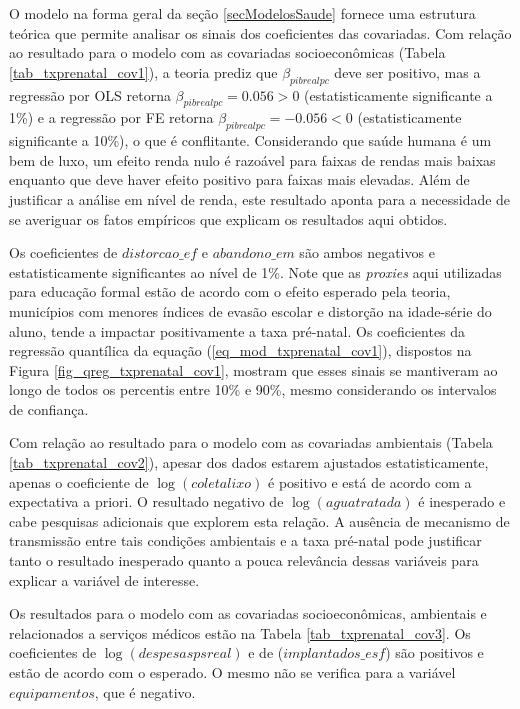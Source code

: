 \documentclass[twoside,onecolumn,12pt]{article}
\numberwithin{outputctr}{section}
\begin{document}
O modelo na forma geral da seção \ref{secModelosSaude} fornece uma estrutura te\'{o}rica que permite analisar os sinais dos coeficientes das covariadas.
Com rela\c{c}\~{a}o ao resultado para o modelo com as covariadas socioeconômicas (Tabela \ref{tab_txprenatal_cov1}),
a teoria prediz que $\beta_{pibrealpc}$ deve ser positivo, mas
a regress\~{a}o por OLS retorna $\beta_{pibrealpc} = 0.056 > 0$ (estatisticamente significante a 1\%)
e a regress\~{a}o por FE retorna $\beta_{pibrealpc} = -0.056 < 0$ (estatisticamente significante a 10\%),
o que \'{e} conflitante. Considerando que saúde humana é um bem de luxo, um efeito renda nulo é razoável para faixas de rendas mais baixas enquanto que deve haver efeito positivo para faixas mais elevadas. Além de justificar a análise em nível de renda, este resultado aponta para a necessidade de se averiguar os fatos empíricos que explicam os resultados aqui obtidos.

Os coeficientes de $distorcao\_ef$ e $abandono\_em$ s\~{a}o ambos negativos e estatisticamente significantes ao n\'{i}vel de 1\%. Note que as \textit{proxies} aqui utilizadas para educação formal estão de acordo com o efeito esperado pela teoria, municípios com menores índices de evasão escolar e distorção na idade-série do aluno, tende a impactar positivamente a taxa pré-natal. Os coeficientes da regress\~{a}o quant\'{i}lica da equação (\ref{eq_mod_txprenatal_cov1}), dispostos na Figura \ref{fig_qreg_txprenatal_cov1}, mostram que esses sinais se mantiveram ao longo de todos os percentis entre 10\% e 90\%, mesmo considerando os intervalos de confian\c{c}a.

Com rela\c{c}\~{a}o ao resultado para o modelo com as covariadas ambientais (Tabela \ref{tab_txprenatal_cov2}), apesar dos dados estarem ajustados estatisticamente, apenas o coeficiente de $\log{(coletalixo)}$ \'{e} positivo e está de acordo com a expectativa a priori. O resultado negativo de $\log{(aguatratada)}$ \'{e} inesperado e cabe pesquisas adicionais que explorem esta relação. A ausência de mecanismo de transmissão entre tais condições ambientais e a taxa pré-natal pode justificar tanto o resultado inesperado quanto a pouca relevância dessas vari\'{a}veis para explicar a vari\'{a}vel de interesse.

Os resultados para o modelo com as covariadas socioeconômicas, ambientais e relacionados a serviços médicos estão na Tabela \ref{tab_txprenatal_cov3}. Os coeficientes de $\log{(despesaspsreal)}$ e de ($implantados\_esf$) s\~{a}o positivos e estão de acordo com o esperado. O mesmo não se verifica para a variável $equipamentos$, que \'{e} negativo. 
\end{document}
